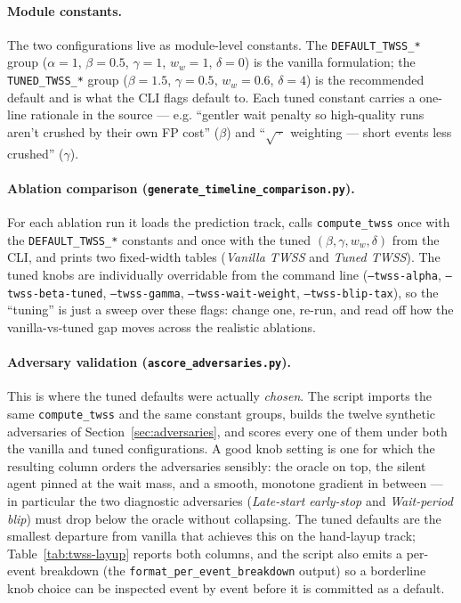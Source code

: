\documentclass[11pt]{article}
\begin{document}
\paragraph{Module constants.}
The two configurations live as module-level constants. The
\texttt{DEFAULT\_TWSS\_*} group ($\alpha{=}1$, $\beta{=}0.5$,
$\gamma{=}1$, $w_w{=}1$, $\delta{=}0$) is the vanilla formulation; the
\texttt{TUNED\_TWSS\_*} group ($\beta{=}1.5$, $\gamma{=}0.5$,
$w_w{=}0.6$, $\delta{=}4$) is the recommended default and is what the
CLI flags default to. Each tuned constant carries a one-line rationale
in the source --- e.g. ``gentler wait penalty so high-quality runs
aren't crushed by their own FP cost'' ($\beta$) and ``$\sqrt{\,\cdot\,}$
weighting --- short events less crushed'' ($\gamma$).

\paragraph{Ablation comparison
(\texttt{generate\_timeline\_comparison.py}).}
For each ablation run it loads the prediction track, calls
\texttt{compute\_twss} once with the \texttt{DEFAULT\_TWSS\_*}
constants and once with the tuned $(\beta, \gamma, w_w, \delta)$ from
the CLI, and prints two fixed-width tables (\emph{Vanilla TWSS} and
\emph{Tuned TWSS}). The tuned knobs are individually overridable from
the command line (\texttt{--twss-alpha}, \texttt{--twss-beta-tuned},
\texttt{--twss-gamma}, \texttt{--twss-wait-weight},
\texttt{--twss-blip-tax}), so the ``tuning'' is just a sweep over these
flags: change one, re-run, and read off how the vanilla-vs-tuned gap
moves across the realistic ablations.

\paragraph{Adversary validation
(\texttt{ascore\_adversaries.py}).}
This is where the tuned defaults were actually \emph{chosen}. The
script imports the same \texttt{compute\_twss} and the same constant
groups, builds the twelve synthetic adversaries of
Section~\ref{sec:adversaries}, and scores every one of them under both
the vanilla and tuned configurations. A good knob setting is one for
which the resulting column orders the adversaries sensibly: the oracle
on top, the silent agent pinned at the wait mass, and a smooth,
monotone gradient in between --- in particular the two diagnostic
adversaries (\emph{Late-start early-stop} and \emph{Wait-period blip})
must drop below the oracle without collapsing. The tuned defaults are
the smallest departure from vanilla that achieves this on the
hand-layup track; Table~\ref{tab:twss-layup} reports both columns, and
the script also emits a per-event breakdown (the
\texttt{format\_per\_event\_breakdown} output) so a borderline knob
choice can be inspected event by event before it is committed as a
default.
\end{document}
